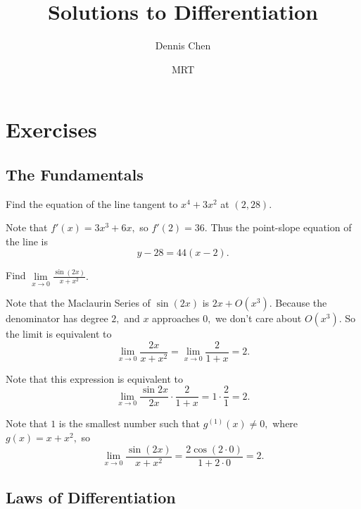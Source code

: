 \documentclass[mast]{lucky}
\title{Solutions to Differentiation}
\author{Dennis Chen}
\date{MRT}
\begin{document}
\maketitle

\toc

\pagebreak\section{Exercises}

\subsection{The Fundamentals}

\begin{exer}
Find the equation of the line tangent to $x^4+3x^2$ at $(2,28).$
\end{exer}

\begin{sol}
Note that $f'(x)=3x^3+6x,$ so $f'(2)=36.$ Thus the point-slope equation of the line is
\[y-28=44(x-2).\]
\end{sol}

\begin{exam}
Find $\lim\limits_{x\to 0}\frac{\sin (2x)}{x+x^2}.$
\end{exam}

\begin{sol}
Note that the Maclaurin Series of $\sin(2x)$ is $2x+O(x^3).$ Because the denominator has degree $2,$ and $x$ approaches $0,$ we don't care about $O(x^3).$ So the limit is equivalent to
\[\lim\limits_{x\to 0}\frac{2x}{x+x^2}=\lim\limits_{x\to 0}\frac{2}{1+x}=2.\]
\end{sol}

\begin{sol}[2 (Factoring)]
Note that this expression is equivalent to
\[\lim_{x\to 0}\frac{\sin 2x}{2x}\cdot\frac{2}{1+x}=1\cdot \frac{2}{1}=2.\]
\end{sol}

\begin{sol}[3 (L'Hopital's)]
Note that $1$ is the smallest number such that $g^{(1)}(x)\neq 0,$ where $g(x)=x+x^2,$ so
\[\lim_{x\to 0}\frac{\sin (2x)}{x+x^2}=\frac{2\cos(2\cdot 0)}{1+2\cdot 0}=2.\]
\end{sol}

\subsection{Laws of Differentiation}
\end{document}

